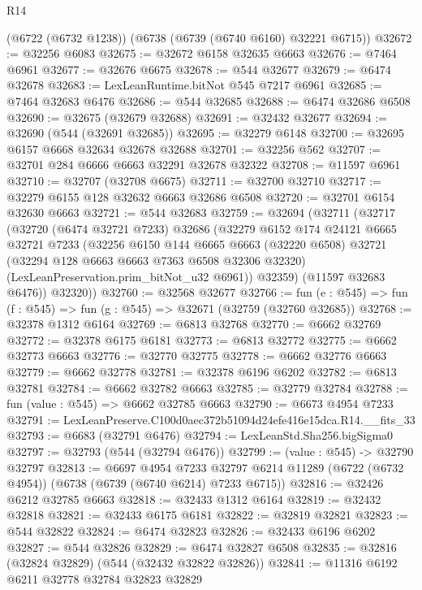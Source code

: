 \begin{lexlean}{R14}
\begin{coremodule}
    (@6722 (@6732 @1238))
    (@6738 (@6739 (@6740 @6160) @32221 @6715))
@32672 := @32256 @6083
@32675 := @32672 @6158 @32635 @6663
@32676 := @7464 @6961
@32677 := @32676 @6675
@32678 := @544 @32677
@32679 := @6474 @32678
@32683 := LexLeanRuntime.bitNot @545 @7217 @6961
@32685 := @7464 @32683 @6476
@32686 := @544 @32685
@32688 := @6474 @32686 @6508
@32690 := @32675 (@32679 @32688)
@32691 := @32432 @32677
@32694 := @32690 (@544 (@32691 @32685))
@32695 := @32279 @6148
@32700 := @32695 @6157 @6668 @32634 @32678 @32688
@32701 := @32256 @562
@32707 := @32701 @284 @6666 @6663 @32291 @32678 @32322
@32708 := @11597 @6961
@32710 := @32707 (@32708 @6675)
@32711 := @32700 @32710
@32717 := @32279 @6155 @128 @32632 @6663 @32686 @6508
@32720 := @32701 @6154 @32630 @6663
@32721 := @544 @32683
@32759 := @32694
    (@32711
      (@32717
        (@32720
          (@6474 @32721 @7233)
          @32686
          (@32279
            @6152
            @174
            @24121
            @6665
            @32721
            @7233
            (@32256
              @6150
              @144
              @6665
              @6663
              (@32220 @6508)
              @32721
              (@32294 @128 @6663 @6663 @7363 @6508 @32306 @32320)
              (LexLeanPreservation.prim_bitNot_u32 @6961))
            @32359)
          (@11597 @32683 @6476))
        @32320))
@32760 := @32568 @32677
@32766 := fun (e : @545) => fun (f : @545) => fun (g : @545) => @32671 (@32759 (@32760 @32685))
@32768 := @32378 @1312 @6164
@32769 := @6813 @32768
@32770 := @6662 @32769
@32772 := @32378 @6175 @6181
@32773 := @6813 @32772
@32775 := @6662 @32773 @6663
@32776 := @32770 @32775
@32778 := @6662 @32776 @6663
@32779 := @6662 @32778
@32781 := @32378 @6196 @6202
@32782 := @6813 @32781
@32784 := @6662 @32782 @6663
@32785 := @32779 @32784
@32788 := fun (value : @545) => @6662 @32785 @6663
@32790 := @6673 @4954 @7233
@32791 := LexLeanPreserve.C100d0aec372b51094d24efe416e15dca.R14.__fits_33
@32793 := @6683 (@32791 @6476)
@32794 := LexLeanStd.Sha256.bigSigma0
@32797 := @32793 (@544 (@32794 @6476))
@32799 := (value : @545) -> @32790 @32797
@32813 := @6697
    @4954
    @7233
    @32797
    @6214
    @11289
    (@6722 (@6732 @4954))
    (@6738 (@6739 (@6740 @6214) @7233 @6715))
@32816 := @32426 @6212 @32785 @6663
@32818 := @32433 @1312 @6164
@32819 := @32432 @32818
@32821 := @32433 @6175 @6181
@32822 := @32819 @32821
@32823 := @544 @32822
@32824 := @6474 @32823
@32826 := @32433 @6196 @6202
@32827 := @544 @32826
@32829 := @6474 @32827 @6508
@32835 := @32816 (@32824 @32829) (@544 (@32432 @32822 @32826))
@32841 := @11316 @6192 @6211 @32778 @32784 @32823 @32829

\end{coremodule}
\end{lexlean}
